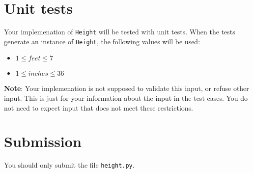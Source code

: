 \section*{Unit tests}
Your implemenation of \texttt{Height} will be tested with unit tests.
When the tests generate an instance of \texttt{Height}, the following values will be used:
\begin{itemize}
\item $1 \le feet \le 7$
\item $1 \le inches \le 36$ 
\end{itemize}

\textbf{Note}: Your implemenation is not supposed to validate this input, or refuse other input.
This is just for your information about the input in the test cases. 
You do not need to expect input that does not meet these restrictions.

\section*{Submission}
You should only submit the file \texttt{height.py}.
